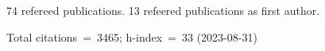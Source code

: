 74 refereed publications. 13 refeered publications as first author.

Total citations~=~3465; h-index~=~33 (2023-08-31)